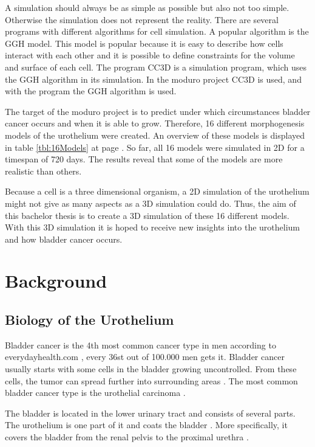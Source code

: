 A simulation should always be as simple as possible but also not too simple. Otherwise the simulation does not represent the reality. 
There are several programs with different algorithms for cell simulation. A popular algorithm is the \ac{GGH} model. This model is popular because it is easy to describe how cells interact with each other and it is possible to define constraints for the volume and surface of each cell. \newline
The program \ac{CC3D} is a simulation program, which uses the \ac{GGH} algorithm in its simulation. In the moduro project \ac{CC3D} is used, and with the program the \ac{GGH} algorithm is used.

The target of the moduro project is to predict under which circumstances bladder cancer occurs and when it is able to grow. Therefore, 16 different morphogenesis models of the urothelium were created. An overview of these models is displayed in table \ref{tbl:16Models} at page \pageref{tbl:16Models}. So far, all 16 models were simulated in 2D for a timespan of 720 days. The results reveal that some of the models are more realistic than others.

Because a cell is a three dimensional organism, a 2D simulation of the urothelium might not give as many aspects as a 3D simulation could do. Thus, the aim of this bachelor thesis is to create a 3D simulation of these 16 different models. With this 3D simulation it is hoped to receive new insights into the urothelium and how bladder cancer occurs.

\section{Background}
\subsection{Biology of the Urothelium}
Bladder cancer is the 4th most common cancer type in men according to everydayhealth.com \cite{EveryDayHealth.com}, every 36st out of 100.000 men gets it. Bladder cancer usually starts with some cells in the bladder growing uncontrolled. From these cells, the tumor can spread further into surrounding areas \cite{Cancer.org}. The most common bladder cancer type is the urothelial carcinoma \cite{Cancer.org}.

The bladder is located in the lower urinary tract and consists of several parts. The urothelium is one part of it and coats the bladder \cite{Lazzeri2006}. More specifically, it covers the bladder from the renal pelvis to the proximal urethra \cite{Yamany2014, Birder2005}.


